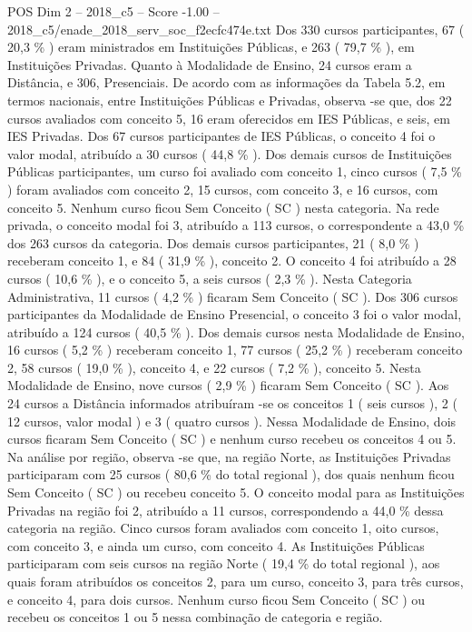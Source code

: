 \begin{textsample}{POS Dim 2 – 2018\_c5 – Score -1.00 – 2018\_c5/enade\_2018\_serv\_soc\_f2ecfc474e.txt}
Dos 330 cursos participantes, 67 ( 20,3 \% ) eram ministrados em Instituições Públicas, e 263 ( 79,7 \% ), em Instituições Privadas.
Quanto à Modalidade de Ensino, 24 cursos eram a Distância, e 306, Presenciais.
De acordo com as informações da Tabela 5.2, em termos nacionais, entre Instituições Públicas e Privadas, observa -se que, dos 22 cursos avaliados com conceito 5, 16 eram oferecidos em IES Públicas, e seis, em IES Privadas.
Dos 67 cursos participantes de IES Públicas, o conceito 4 foi o valor modal, atribuído a 30 cursos ( 44,8 \% ).
Dos demais cursos de Instituições Públicas participantes, um curso foi avaliado com conceito 1, cinco cursos ( 7,5 \% ) foram avaliados com conceito 2, 15 cursos, com conceito 3, e 16 cursos, com conceito 5.
Nenhum curso ficou Sem Conceito ( SC ) nesta categoria.
Na rede privada, o conceito modal foi 3, atribuído a 113 cursos, o correspondente a 43,0 \% dos 263 cursos da categoria.
Dos demais cursos participantes, 21 ( 8,0 \% ) receberam conceito 1, e 84 ( 31,9 \% ), conceito 2.
O conceito 4 foi atribuído a 28 cursos ( 10,6 \% ), e o conceito 5, a seis cursos ( 2,3 \% ).
Nesta Categoria Administrativa, 11 cursos ( 4,2 \% ) ficaram Sem Conceito ( SC ).
Dos 306 cursos participantes da Modalidade de Ensino Presencial, o conceito 3 foi o valor modal, atribuído a 124 cursos ( 40,5 \% ).
Dos demais cursos nesta Modalidade de Ensino, 16 cursos ( 5,2 \% ) receberam conceito 1, 77 cursos ( 25,2 \% ) receberam conceito 2, 58 cursos ( 19,0 \% ), conceito 4, e 22 cursos ( 7,2 \% ), conceito 5.
Nesta Modalidade de Ensino, nove cursos ( 2,9 \% ) ficaram Sem Conceito ( SC ).
Aos 24 cursos a Distância informados atribuíram -se os conceitos 1 ( seis cursos ), 2 ( 12 cursos, valor modal ) e 3 ( quatro cursos ).
Nessa Modalidade de Ensino, dois cursos ficaram Sem Conceito ( SC ) e nenhum curso recebeu os conceitos 4 ou 5.
Na análise por região, observa -se que, na região Norte, as Instituições Privadas participaram com 25 cursos ( 80,6 \% do total regional ), dos quais nenhum ficou Sem Conceito ( SC ) ou recebeu conceito 5.
O conceito modal para as Instituições Privadas na região foi 2, atribuído a 11 cursos, correspondendo a 44,0 \% dessa categoria na região.
Cinco cursos foram avaliados com conceito 1, oito cursos, com conceito 3, e ainda um curso, com conceito 4.
As Instituições Públicas participaram com seis cursos na região Norte ( 19,4 \% do total regional ), aos quais foram atribuídos os conceitos 2, para um curso, conceito 3, para três cursos, e conceito 4, para dois cursos.
Nenhum curso ficou Sem Conceito ( SC ) ou recebeu os conceitos 1 ou 5 nessa combinação de categoria e região.

\end{textsample}
